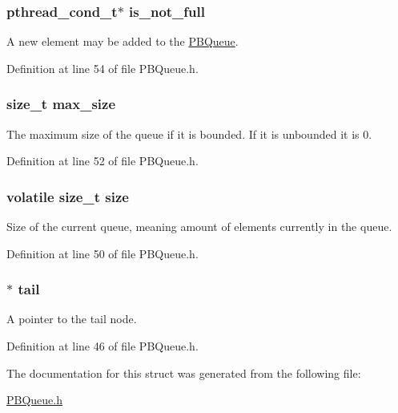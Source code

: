 \hypertarget{struct_p_b_queue_a67d9c501515653db90eee366c6471782}{}
\subsubsection[{is\+\_\+not\+\_\+full}]{\setlength{\rightskip}{0pt plus 5cm}pthread\+\_\+cond\+\_\+t$\ast$ is\+\_\+not\+\_\+full}\label{struct_p_b_queue_a67d9c501515653db90eee366c6471782}


A new element may be added to the \hyperlink{struct_p_b_queue}{P\+B\+Queue}. 



Definition at line 54 of file P\+B\+Queue.\+h.

\hypertarget{struct_p_b_queue_af4728438dee601cb2554d9bf18d78a43}{}
\subsubsection[{max\+\_\+size}]{\setlength{\rightskip}{0pt plus 5cm}size\+\_\+t max\+\_\+size}\label{struct_p_b_queue_af4728438dee601cb2554d9bf18d78a43}


The maximum size of the queue if it is bounded. If it is unbounded it is 0. 



Definition at line 52 of file P\+B\+Queue.\+h.

\hypertarget{struct_p_b_queue_ad4e7ef20daed39b2cd453058b6fc4c63}{}
\subsubsection[{size}]{\setlength{\rightskip}{0pt plus 5cm}volatile size\+\_\+t size}\label{struct_p_b_queue_ad4e7ef20daed39b2cd453058b6fc4c63}


Size of the current queue, meaning amount of elements currently in the queue. 



Definition at line 50 of file P\+B\+Queue.\+h.

\hypertarget{struct_p_b_queue_a40a7192117a39559e60255079a1134fb}{}
\subsubsection[{tail}]{$\ast$ tail}\label{struct_p_b_queue_a40a7192117a39559e60255079a1134fb}


A pointer to the tail node. 



Definition at line 46 of file P\+B\+Queue.\+h.



The documentation for this struct was generated from the following file\+:\begin{DoxyCompactItemize}
\item 
\hyperlink{_p_b_queue_8h}{P\+B\+Queue.\+h}\end{DoxyCompactItemize}

